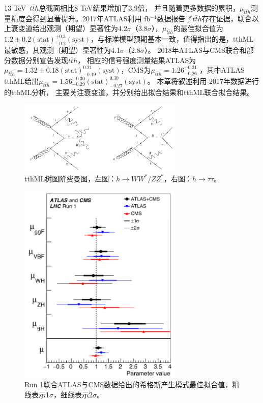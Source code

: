13 TeV~$t\bar{t}h$总截面相比8 TeV结果增加了3.9倍\cite{Heinemeyer:2013tqa,XSWG13TeV}，
并且随着更多数据的累积，$\mu_{t\bar{t}h}$测量精度会得到显著提升。2017年ATLAS利用 fb$^{-1}$数据报告了$t\bar{t}h$存在证据\cite{Aaboud:2017jvq}，联合以上衰变道给出观测（期望）显著性为4.2$\sigma$（3.8$\sigma$），$\mu_{t\bar{t}h}$的最佳拟合值为$1.2\pm0.2(\text{stat})^{+0.3}_{-0.2}(\text{syst})$，与标准模型预期基本一致，值得指出的是，tthML最敏感，其观测（期望）显著性为4.1$\sigma$（2.8$\sigma$）。
2018年ATLAS与CMS联合\RunOne 和\RunTwo 部分数据分别宣告发现$t\bar{t}h$\cite{Aaboud:2018urx,PhysRevLett.120.231801}，
相应的信号强度测量结果ATLAS为$\mu_{t\bar{t}h}=1.32\pm0.18(\text{stat})^{0.21}_{-0.19}(\text{syst})$，CMS为$\mu_{t\bar{t}h}=1.26^{+0.31}_{-0.26}$
，其中ATLAS tthML给出$\mu_{t\bar{t}h}=1.56^{+0.30}_{-0.29}(\text{stat})^{0.30}_{-0.27}(\text{syst})$。
本章将叙述利用-2017年数据进行的tthML分析，
主要关注\ltwotau 衰变道，并分别给出\ltwotau 拟合结果和tthML联合拟合结果。
\begin{figure}[h]
\centering
 \includegraphics[width=0.7\textwidth]{fig/diagram_tth_LO.png}
 \caption{tthML树图阶费曼图，左图：$h\rightarrow WW^*/ZZ^*$，右图：$h\rightarrow \tau\tau$。}
 \label{fig:diagram_tthML_LO}
\end{figure}

\begin{figure}[h]
\centering
 \includegraphics[width=0.7\textwidth]{fig/ATLAS_CMS_HiggsMes.png}
 \caption{Run 1联合ATLAS与CMS数据给出的希格斯产生模式最佳拟合值\cite{Khachatryan:2016vau}，粗线表示1$\sigma$，细线表示2$\sigma$。}
 \label{fig:HiggsPromu_ATALS_CMS}
\end{figure}

